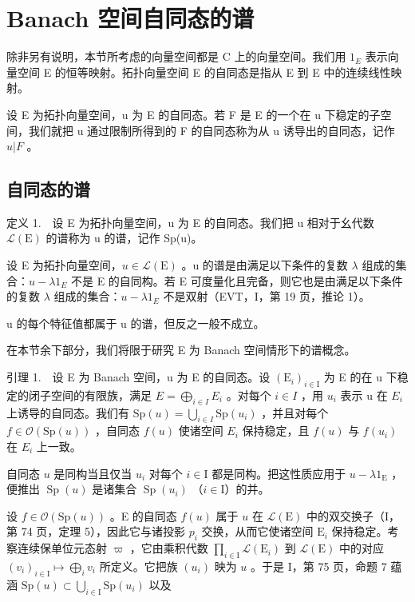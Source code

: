 \section{Banach 空间自同态的谱}

除非另有说明，本节所考虑的向量空间都是 C 上的向量空间。我们用 \(1_{E}\) 表示向量空间 E 的恒等映射。拓扑向量空间 E 的自同态是指从 E 到 E 中的连续线性映射。

设 E 为拓扑向量空间，u 为 E 的自同态。若 F 是 E 的一个在 u 下稳定的子空间，我们就把 u 通过限制所得到的 F 的自同态称为从 u 诱导出的自同态，记作 \(u|F\) 。

\subsection{自同态的谱}

定义 1.　设 E 为拓扑向量空间，u 为 E 的自同态。我们把 u 相对于幺代数 \(\mathcal{L}(\mathrm{E})\) 的谱称为 u 的谱，记作 Sp(u)。

设 E 为拓扑向量空间，\(u \in \mathcal{L}(\mathrm{E})\) 。u 的谱是由满足以下条件的复数 \(\lambda\) 组成的集合：\(u - \lambda1_{E}\) 不是 E 的自同构。若 E 可度量化且完备，则它也是由满足以下条件的复数 \(\lambda\) 组成的集合：\(u - \lambda1_{E}\) 不是双射（EVT，I，第 19 页，推论 1）。

u 的每个特征值都属于 u 的谱，但反之一般不成立。

在本节余下部分，我们将限于研究 E 为 Banach 空间情形下的谱概念。

引理 1.　设 E 为 Banach 空间，u 为 E 的自同态。设 \((\mathrm{E}_{i})_{i\in\mathrm{I}}\) 为 E 的在 u 下稳定的闭子空间的有限族，满足 \(E = \bigoplus_{i\in I} E_{i}\) 。对每个 \(i \in I\) ，用 \(u_{i}\) 表示 u 在 \(E_{i}\) 上诱导的自同态。我们有 \(\mathrm{Sp}(u) = \bigcup_{i\in I} \mathrm{Sp}(u_{i})\) ，并且对每个 \(f \in \mathcal{O}(\mathrm{Sp}(u))\) ，自同态 \(f(u)\) 使诸空间 \(E_{i}\) 保持稳定，且 \(f(u)\) 与 \(f(u_{i})\) 在 \(E_{i}\) 上一致。

自同态 \(u\) 是同构当且仅当 \(u_i\) 对每个 \(i \in \mathrm{I}\) 都是同构。把这性质应用于 \(u - \lambda 1_{\mathrm{E}}\) ，便推出 \(\operatorname{Sp}(u)\) 是诸集合 \(\operatorname{Sp}(u_i)\) （\(i \in \mathrm{I}\)）的并。

设 \(f \in \mathcal{O}(\mathrm{Sp}(u))\) 。E 的自同态 \(f(u)\) 属于 \(u\) 在 \(\mathcal{L}(\mathrm{E})\) 中的双交换子（I，第 74 页，定理 5），因此它与诸投影 \(p_i\) 交换，从而它使诸空间 \(\mathrm{E}_i\) 保持稳定。考察连续保单位元态射 \(\varpi\) ，它由乘积代数 \(\prod_{i \in \mathrm{I}} \mathcal{L}(\mathrm{E}_i)\) 到 \(\mathcal{L}(\mathrm{E})\) 中的对应 \((v_i)_{i \in \mathrm{I}} \mapsto \bigoplus_i v_i\) 所定义。它把族 \((u_i)\) 映为 \(u\) 。于是 I，第 75 页，命题 7 蕴涵 \(\mathrm{Sp}(u) \subset \bigcup_{i \in \mathrm{I}} \mathrm{Sp}(u_i)\) 以及

